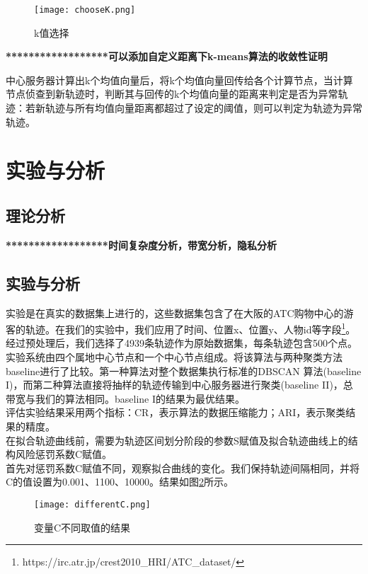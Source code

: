 \begin{figure}[h]
	\texttt{[image: chooseK.png]}
	\caption{k值选择}
	\label{chooseK}
\end{figure}

\textbf{******************可以添加自定义距离下k-means算法的收敛性证明}


中心服务器计算出k个均值向量后，将k个均值向量回传给各个计算节点，当计算节点侦查到新轨迹时，判断其与回传的k个均值向量的距离来判定是否为异常轨迹：若新轨迹与所有均值向量距离都超过了设定的阈值，则可以判定为轨迹为异常轨迹。






\section{实验与分析}
\subsection{理论分析}
\textbf{******************时间复杂度分析，带宽分析，隐私分析}

\subsection{实验与分析}
实验是在真实的数据集上进行的，这些数据集包含了在大阪的ATC购物中心的游客的轨迹。在我们的实验中，我们应用了时间、位置x、位置y、人物id等字段\footnote[1]{https://irc.atr.jp/crest2010_HRI/ATC_dataset/}。经过预处理后，我们选择了4939条轨迹作为原始数据集，每条轨迹包含500个点。\\
实验系统由四个属地中心节点和一个中心节点组成。将该算法与两种聚类方法baseline进行了比较。第一种算法对整个数据集执行标准的DBSCAN 算法(baseline I)，而第二种算法直接将抽样的轨迹传输到中心服务器进行聚类(baseline II)，总带宽与我们的算法相同。baseline I的结果为最优结果。\\
评估实验结果采用两个指标：CR，表示算法的数据压缩能力；ARI，表示聚类结果的精度。\\

在拟合轨迹曲线前，需要为轨迹区间划分阶段的参数S赋值及拟合轨迹曲线上的结构风险惩罚系数C赋值。\\
首先对惩罚系数C赋值不同，观察拟合曲线的变化。我们保持轨迹间隔相同，并将C的值设置为0.001、1100、10000。结果如图\ref{differentC}所示。

\begin{figure}[h]
	\texttt{[image: differentC.png]}
	\caption{变量C不同取值的结果}
	\label{differentC}
\end{figure}

